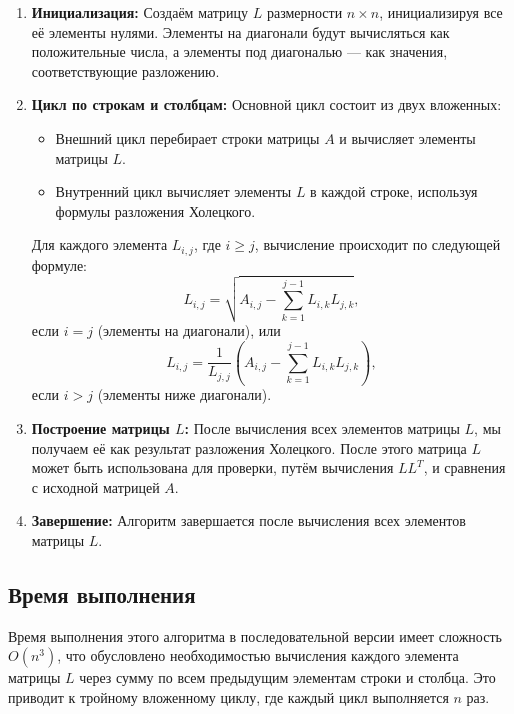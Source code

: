 \documentclass[12pt, russian]{extarticle}
\begin{document}
\begin{spacing}{1.5}
\begin{enumerate}
\item
\textbf{Инициализация:} Создаём матрицу \( L \) размерности \( n \times n \), инициализируя все её элементы нулями. Элементы на диагонали будут вычисляться как положительные числа, а элементы под диагональю — как значения, соответствующие разложению.


\item
\textbf{Цикл по строкам и столбцам:} Основной цикл состоит из двух вложенных:
   \begin{itemize}
       \item Внешний цикл перебирает строки матрицы \( A \) и вычисляет элементы матрицы \( L \).
       \item Внутренний цикл вычисляет элементы \( L \) в каждой строке, используя формулы разложения Холецкого.
   \end{itemize}
   
   Для каждого элемента \( L_{i,j} \), где \( i \geq j \), вычисление происходит по следующей формуле:
   \[
   L_{i,j} = \sqrt{A_{i,j} - \sum_{k=1}^{j-1} L_{i,k} L_{j,k}},
   \]
   если \( i = j \) (элементы на диагонали), или
   \[
   L_{i,j} = \frac{1}{L_{j,j}} \left( A_{i,j} - \sum_{k=1}^{j-1} L_{i,k} L_{j,k} \right),
   \]
   если \( i > j \) (элементы ниже диагонали).

\item
\textbf{Построение матрицы \( L \):} После вычисления всех элементов матрицы \( L \), мы получаем её как результат разложения Холецкого. После этого матрица \( L \) может быть использована для проверки, путём вычисления \( LL^T \), и сравнения с исходной матрицей \( A \).

\item
\textbf{Завершение:} Алгоритм завершается после вычисления всех элементов матрицы \( L \).

\end{enumerate}

\subsection*{Время выполнения}

Время выполнения этого алгоритма в последовательной версии имеет сложность \( O(n^3) \), что обусловлено необходимостью вычисления каждого элемента матрицы \( L \) через сумму по всем предыдущим элементам строки и столбца. Это приводит к тройному вложенному циклу, где каждый цикл выполняется \( n \) раз.


\end{spacing}
\end{document}
